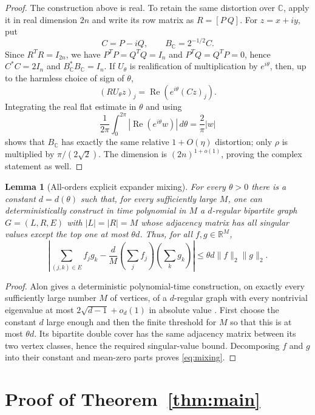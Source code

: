 \documentclass[11pt]{article}
\newtheorem{lemma}[theorem]{Lemma}
\newcommand{\R}{\mathbb R}
\newcommand{\C}{\mathbb C}
\begin{document}
\begin{proof}
The construction above is real.  To retain the same distortion over $\C$,
apply it in real dimension $2n$ and write its row matrix as $R=[P\ Q]$.
For $z=x+iy$, put
\[
 C=P-iQ,\qquad B_\C=2^{-1/2}C.
\]
Since $R^TR=I_{2n}$, we have
$P^TP=Q^TQ=I_n$ and $P^TQ=Q^TP=0$, hence $C^*C=2I_n$ and
$B_\C^*B_\C=I_n$.  If $U_\theta$ is realification of multiplication by
$e^{i\theta}$, then, up to the harmless choice of sign of $\theta$,
\[
 (RU_\theta z)_j=\operatorname{Re}(e^{i\theta}(Cz)_j).
\]
Integrating the real flat estimate in $\theta$ and using
\[
 \frac1{2\pi}\int_0^{2\pi}|\operatorname{Re}(e^{i\theta}w)|\,d\theta
   =\frac{2}{\pi}|w|
\]
shows that $B_\C$ has exactly the same relative $1+O(\eta)$ distortion;
only $\rho$ is multiplied by $\pi/(2\sqrt2)$.  The dimension is
$(2n)^{1+o(1)}$, proving the complex statement as well.
\end{proof}

\begin{lemma}[All-orders explicit expander mixing]\label{lem:expander}
For every $\theta>0$ there is a constant $d=d(\theta)$ such that, for every
sufficiently large $M$, one can deterministically construct in time
polynomial in $M$ a $d$-regular bipartite graph $G=(L,R,E)$ with
$|L|=|R|=M$ whose adjacency matrix has all singular values except the top one
at most $\theta d$.  Thus, for all $f,g\in\R^M$,
\begin{equation}\label{eq:mixing}
 \left|\sum_{(j,k)\in E}f_jg_k
 -\frac dM\left(\sum_jf_j\right)\left(\sum_kg_k\right)\right|
 \leq \theta d\|f\|_2\|g\|_2.
\end{equation}
\end{lemma}

\begin{proof}
Alon gives a deterministic polynomial-time construction, on exactly every
sufficiently large number $M$ of vertices, of a $d$-regular graph with every
nontrivial eigenvalue at most $2\sqrt{d-1}+o_d(1)$ in absolute value
\cite{Alon}.  First choose the constant $d$ large enough and then the finite
threshold for $M$ so that this is at most $\theta d$.  Its bipartite double
cover has the same adjacency matrix between its two vertex classes, hence the
required singular-value bound.  Decomposing $f$ and $g$ into their constant
and mean-zero parts proves \eqref{eq:mixing}.
\end{proof}

\section{Proof of Theorem~\ref{thm:main}}
\end{document}
